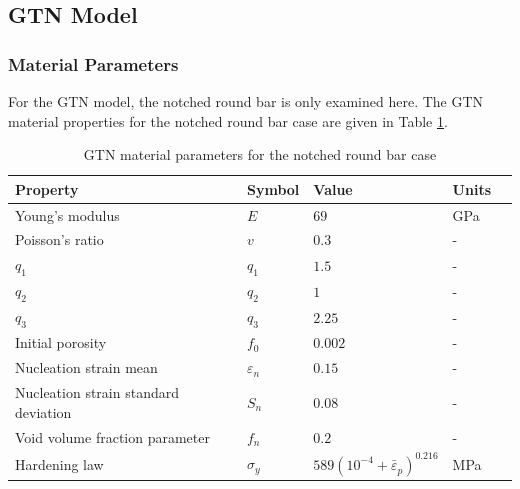 \documentclass[sn-mathphys,Numbered]{sn-jnl}%
\begin{document}





\subsection{GTN Model}

\subsubsection{Material Parameters}
For the GTN model, the notched round bar is only examined here.
The GTN material properties for the notched round bar case are given in Table \ref{table:NRB_material_properties_GTN}.
\begin{table}[htb]
	\centering
		\begin{tabular}{lllll} \hline
		    Property & Symbol & Value & Units  \\ \hline 
		    Young's modulus & $E$ & $69$ & GPa \\
		    Poisson's ratio & $v$ & $0.3$   & - \\
		    $q_1$ & $q_1$ & $1.5$  & -\\
		    $q_2$ & $q_2$ & $1$  & -\\
		    $q_3$ & $q_3$ & $2.25$  & -\\
		    Initial porosity & $f_0$ & $0.002$  &  -\\
		    Nucleation strain mean & $\varepsilon_n$ & $0.15$  &  -\\
		    Nucleation strain standard deviation & $S_n$ & $0.08$  &  -\\
		    Void volume fraction parameter & $f_n$ & $0.2$  & -\\
		    Hardening law & $\sigma_y$ & $589({10^{-4}+\bar{\varepsilon}}_p)^{0.216}$ & MPa  \\
		\hline
		\end{tabular}
	\caption{GTN material parameters for the notched round bar case}
	\label{table:NRB_material_properties_GTN}
\end{table}
\end{document}
